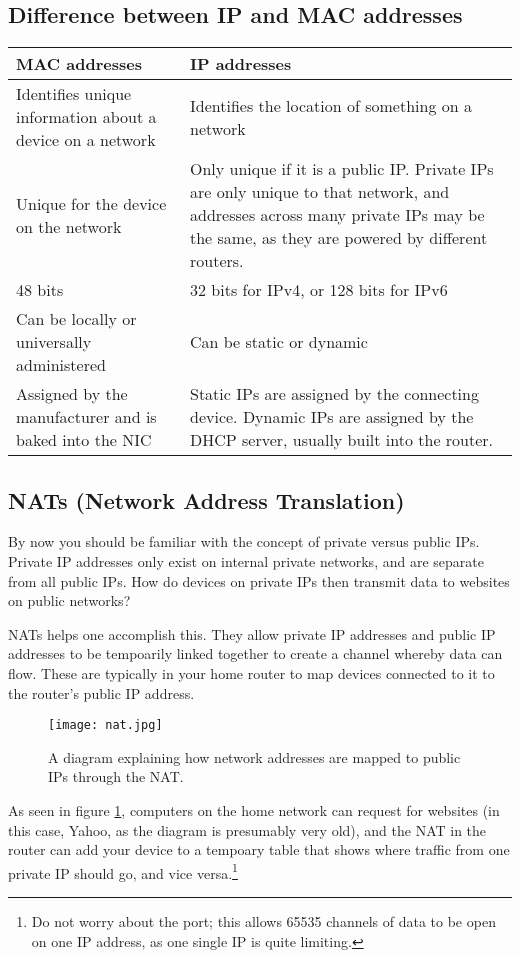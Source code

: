 \documentclass[../main.tex]{subfiles}
\begin{document}
\subsection{Difference between IP and MAC addresses}

\begin{longtable}{|p{}|p{}|}
    \hline 
    \textbf{MAC addresses} & \textbf{IP addresses}
    \\ \hline
    Identifies unique information about a device on a network & Identifies the location of something on a network
    \\ \hline
    Unique for the device on the network & Only unique if it is a public IP. Private IPs are only unique to that network, and addresses across many private IPs may be the same, as they are powered by different routers.
    \\ \hline
    48 bits & 32 bits for IPv4, or 128 bits for IPv6
    \\ \hline
    Can be locally or universally administered & Can be static or dynamic
    \\ \hline
    Assigned by the manufacturer and is baked into the NIC & Static IPs are assigned by the connecting device. Dynamic IPs are assigned by the DHCP server, usually built into the router.
    \\ \hline
\end{longtable}

\subsection{NATs (Network Address Translation)}
\label{2:sec:nats}

By now you should be familiar with the concept of private versus public IPs. Private IP addresses only exist on internal private networks, and are separate from all public IPs. How do devices on private IPs then transmit data to websites on public networks?

NATs helps one accomplish this. They allow private IP addresses and public IP addresses to be tempoarily linked together to create a channel whereby data can flow. These are typically in your home router to map devices connected to it to the router's public IP address.

\begin{figure}[h]
    \centering
    \texttt{[image: nat.jpg]}
    \caption{A diagram explaining how network addresses are mapped to public IPs through the NAT.\footnotemark}
    \label{fig:nat}
\end{figure}

As seen in figure \ref{fig:nat}, computers on the home network can request for websites (in this case, Yahoo, as the diagram is presumably very old), and the NAT in the router can add your device to a tempoary table that shows where traffic from one private IP should go, and vice versa.\footnote{Do not worry about the port; this allows 65535 channels of data to be open on one IP address, as one single IP is quite limiting.}
\end{document}
